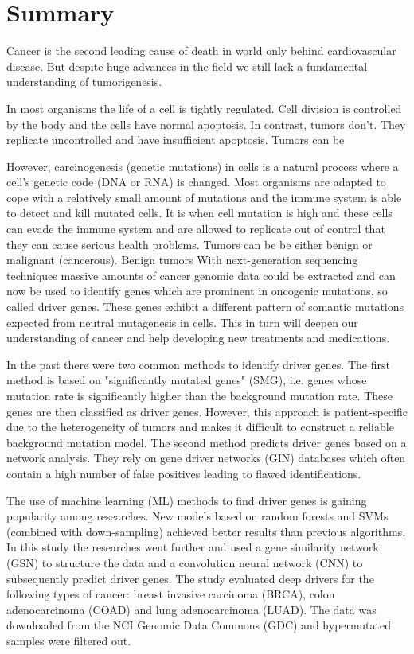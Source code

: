 \documentclass{article}
\begin{document}
\vspace*{-8mm}
\section*{Summary}
Cancer is the second leading cause of death in world only behind cardiovascular disease\cite{bray2018globalCancerStats}. But despite huge advances in the field we still lack a fundamental understanding of tumorigenesis\cite{martinez2020compendiumDriverGenes}.

In most organisms the life of a cell is tightly regulated. Cell division is controlled by the body and the cells have normal apoptosis. In contrast, tumors don't. They replicate uncontrolled and have insufficient apoptosis\cite{essentialsOfCellLive}. Tumors can be 

However, carcinogenesis (genetic mutations) in cells is a natural process where a cell's genetic code (DNA or RNA) is changed.
Most organisms are adapted to cope with a relatively small amount of mutations and the immune system is able to detect and kill mutated cells.
It is when cell mutation is high and these cells can evade the immune system and are allowed to replicate out of control that they can cause serious health problems.
Tumors can be be either benign or malignant (cancerous). Benign tumors 
With next-generation sequencing techniques massive amounts of cancer genomic data could be extracted and can now be used to identify genes which are prominent in oncogenic mutations, so called driver genes. These genes exhibit a different pattern of somantic mutations expected from neutral mutagenesis in cells.
This in turn will deepen our understanding of cancer and help developing new treatments and medications.

In the past there were two common methods to identify driver genes. The first method is based on "significantly mutated genes" (SMG), i.e. genes whose mutation rate is significantly higher than the background mutation rate. These genes are then classified as driver genes. However, this approach is patient-specific due to the heterogeneity of tumors and makes it difficult to construct a reliable background mutation model. The second method predicts driver genes based on a network analysis. They rely on gene driver networks (GIN) databases which often contain a high number of false positives leading to flawed identifications.

The use of machine learning (ML) methods to find driver genes is gaining popularity among researches. New models based on random forests and SVMs (combined with down-sampling) achieved better results than previous algorithms.
In this study the researches went further and used a gene similarity network (GSN) to structure the data and a convolution neural network (CNN) to subsequently predict driver genes. The study evaluated deep drivers for the following types of cancer: breast invasive carcinoma (BRCA), colon adenocarcinoma (COAD) and lung adenocarcinoma (LUAD). The data was downloaded from the NCI Genomic Data Commons (GDC) and hypermutated samples were filtered out.
\end{document}
